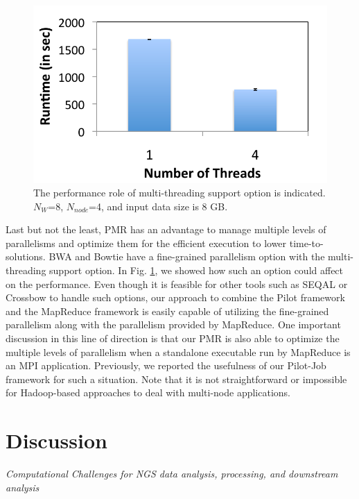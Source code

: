 \documentclass{sig-alternate}
\begin{document}
{\begin{figure} 
 \centering
\includegraphics[scale=0.50]{figures/8GB_4nodes_8w_threadcomp.pdf}
\caption{\small  The performance role of multi-threading support option is indicated.  $N_W$=8, $N_{node}$=4, and input data size is 8 GB.}
  \label{fig:mulit-parallel} 
\end{figure}

Last but not the least, PMR has an advantage to manage multiple levels of parallelisms and optimize them for the efficient execution to lower time-to-solutions.  BWA and Bowtie have a fine-grained parallelism option with the multi-threading support option.   In Fig. \ref{fig:mulit-parallel}, we showed how such an option could affect on the performance.  
Even though it is feasible for other tools such as SEQAL or Crossbow to handle such options, our approach to combine the Pilot framework and the MapReduce framework is easily capable of utilizing the fine-grained parallelism along with the parallelism provided by MapReduce.  One important discussion in this line of direction is that our PMR is also able to optimize the multiple levels of parallelism when a standalone executable run by MapReduce is an MPI application.  Previously, we reported the usefulness of our Pilot-Job framework for such a situation\cite{repex_ptrsa}.  Note that it is not straightforward or impossible for Hadoop-based approaches to deal with multi-node applications.


\section{Discussion}\label{sec:discussions}
\textit{Computational Challenges for NGS data analysis, processing, and downstream analysis}

}
\end{document}
